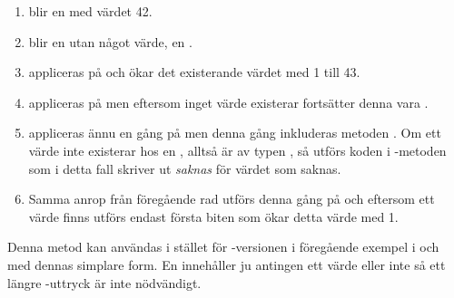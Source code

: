 \SubtaskSolved  \begin{enumerate}
\item {} blir en  med värdet 42.
\item {} blir en  utan något värde, en .
\item {} appliceras på  och ökar det existerande värdet med 1 till 43.
\item {} appliceras på  men eftersom inget värde existerar fortsätter denna vara .
\item {} appliceras ännu en gång på  men denna gång inkluderas metoden . Om ett värde inte existerar hos en , alltså är av typen , så utförs koden i -metoden som i detta fall skriver ut \textit{saknas} för värdet som saknas.
\item Samma anrop från föregående rad utförs denna gång på  och eftersom ett värde finns utförs endast första biten som ökar detta värde med 1.
\end{enumerate}
Denna metod kan användas i stället för -versionen i föregående exempel i och med dennas simplare form. En  innehåller ju antingen ett värde eller inte så ett längre -uttryck är inte nödvändigt.

